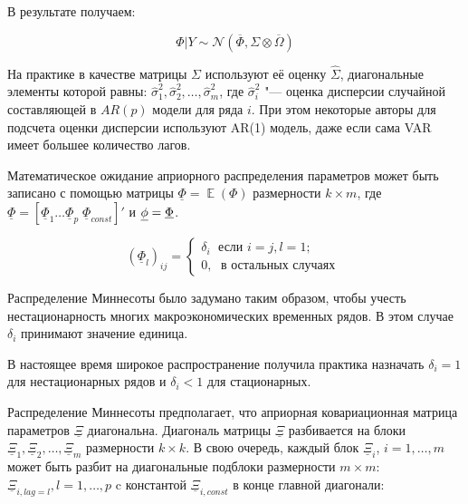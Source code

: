 \documentclass[11pt]{article} %
\DeclareMathOperator{\E}{\mathbb{E}}
\newcommand{\cN}{\mathcal{N}}
\newcommand{\prior}{\underline}
\newcommand{\post}{\overline}
\let\vec\relax
\DeclareMathOperator{\vec}{vec}
\begin{document}
В результате получаем:

\[
\Phi | Y \sim \cN (\post\Phi, \Sigma \otimes \post\Omega)
\]

На практике в качестве матрицы $\Sigma$ используют её оценку $\hat\Sigma$, диагональные элементы которой равны: $\hat\sigma_{1}^2, \hat\sigma_{2}^2,\ldots,\hat\sigma_{m}^2 $, где  $\hat\sigma_{i}^2$ "--- оценка дисперсии случайной составляющей в $AR(p)$ модели для ряда $i$. При этом некоторые авторы для подсчета оценки дисперсии используют AR(1) модель, даже если сама VAR имеет большее количество лагов.

Математическое ожидание априорного распределения параметров может быть записано с помощью матрицы $\prior \Phi = \E (\Phi)$ размерности $k\times m$, где $\prior\Phi=[\prior\Phi_1 \ldots \prior\Phi_p \; \prior\Phi_{const}]'$ и $\prior \phi = \vec{ \prior \Phi}$.


\begin{equation}
(\prior\Phi_l)_{ij}=
\begin{cases}
\delta_i\; \mbox{ если } i=j, l=1;\\
0,\;\text{ в остальных случаях }
\end{cases}\label{minnesota_exp}
\end{equation}


Распределение Миннесоты было задумано таким образом, чтобы учесть нестационарность многих макроэкономических временных рядов. В этом случае $\delta_{i}$ принимают значение единица.

В настоящее время широкое распространение получила практика назначать $\delta_{i}=1$ для нестационарных рядов и $\delta_{i}<1$ для стационарных.

Распределение Миннесоты предполагает, что априорная ковариационная матрица параметров $\prior \Xi$ диагональна. Диагональ матрицы $\prior \Xi$ разбивается на блоки  $\prior \Xi_1,\prior \Xi_2, \ldots, \prior \Xi_m$ размерности $k\times k$. В свою очередь, каждый блок $\prior \Xi_i$, $i=1,\ldots,m$ может быть разбит на диагональные подблоки размерности $m\times m$: $\prior \Xi_{i,lag=l}, l=1,\ldots, p$ c константой $\prior \Xi_{i,const}$  в конце главной диагонали:

\end{document}
